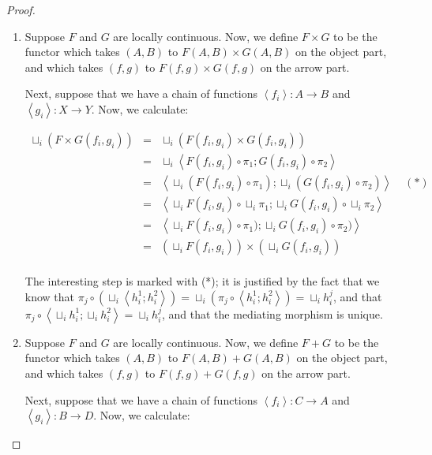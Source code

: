\begin{proof}

\begin{enumerate}
\item Suppose $F$ and $G$ are locally continuous. Now, we define 
$F \times G$ to be the functor which takes $(A,B)$ to $F(A,B) \times G(A,B)$
on the object part, and which takes $(f,g)$ to $F(f,g) \times G(f,g)$ on
the arrow part.

Next, suppose that we have a chain of functions $\left<f_i\right> : A \to B$ and
$\left<g_i\right> : X \to Y$. Now, we calculate:

\begin{displaymath}
\begin{array}{lcl}
  \sqcup_i (F \times G (f_i,g_i)) 
   & = & \sqcup_i (F(f_i,g_i) \times G(f_i,g_i)) \\
   & = & \sqcup_i \left<F(f_i,g_i) \circ \pi_1; 
                        G(f_i,g_i) \circ \pi_2\right>\\
   & = & \left<\sqcup_i (F(f_i,g_i) \circ \pi_1);
               \sqcup_i (G(f_i,g_i) \circ \pi_2)\right> \;\;\;\;(*)\\
   & = & \left<\sqcup_i F(f_i,g_i) \circ \sqcup_i \pi_1;
               \sqcup_i G(f_i,g_i) \circ \sqcup_i \pi_2\right>\\
   & = & \left<\sqcup_i F(f_i,g_i) \circ \pi_1);
               \sqcup_i G(f_i,g_i) \circ \pi_2)\right>\\
   & = & (\sqcup_i F(f_i,g_i)) \times (\sqcup_i G(f_i,g_i))\\
\end{array}
\end{displaymath}

The interesting step is marked with (*); it is justified by the fact
that we know that $\pi_j \circ (\sqcup_i \left<h^1_i;h^2_i\right>) = 
\sqcup_i (\pi_j \circ \left<h^1_i;h^2_i\right>) = 
\sqcup_i h^j_i$,
and that $\pi_j \circ \left<\sqcup_i h^1_i; \sqcup_i h^2_i\right> = \sqcup_i h^j_i$,
and that the mediating morphism is unique. 


\item Suppose $F$ and $G$ are locally continuous. Now, we define 
$F + G$ to be the functor which takes $(A,B)$ to $F(A,B) + G(A,B)$
on the object part, and which takes $(f,g)$ to $F(f,g) + G(f,g)$ on
the arrow part.

Next, suppose that we have a chain of functions $\left<f_i\right> : C \to A$ and
$\left<g_i\right> : B \to D$. Now, we calculate:


\end{enumerate}
\end{proof}
